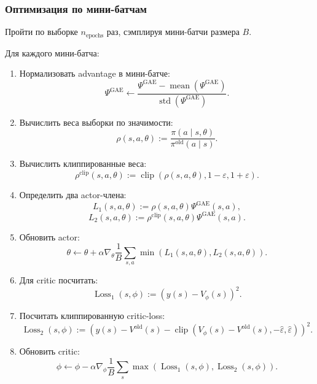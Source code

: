 \documentclass[12pt,a4paper]{article}
\begin{document}
\subsubsection{Оптимизация по мини-батчам}

Пройти по выборке $n_{\mathrm{epochs}}$ раз, сэмплируя мини-батчи размера $B$.

Для каждого мини-батча:

\begin{enumerate}
    \item Нормализовать advantage в мини-батче:
    \[
    \Psi^{\mathrm{GAE}}
    \leftarrow
    \frac{
    \Psi^{\mathrm{GAE}}
    -
    \operatorname{mean}(\Psi^{\mathrm{GAE}})
    }{
    \operatorname{std}(\Psi^{\mathrm{GAE}})
    }.
    \]

    \item Вычислить веса выборки по значимости:
    \[
    \rho(s,a,\theta)
    :=
    \frac{
    \pi(a\mid s,\theta)
    }{
    \pi^{\mathrm{old}}(a\mid s)
    }.
    \]

    \item Вычислить клиппированные веса:
    \[
    \rho^{\mathrm{clip}}(s,a,\theta)
    :=
    \operatorname{clip}
    \left(
    \rho(s,a,\theta),
    1-\varepsilon,
    1+\varepsilon
    \right).
    \]

    \item Определить два actor-члена:
    \[
    L_1(s,a,\theta)
    :=
    \rho(s,a,\theta)
    \Psi^{\mathrm{GAE}}(s,a),
    \]
    \[
    L_2(s,a,\theta)
    :=
    \rho^{\mathrm{clip}}(s,a,\theta)
    \Psi^{\mathrm{GAE}}(s,a).
    \]

    \item Обновить actor:
    \[
    \theta
    \leftarrow
    \theta
    +
    \alpha
    \nabla_\theta
    \frac{1}{B}
    \sum_{s,a}
    \min
    \left(
    L_1(s,a,\theta),
    L_2(s,a,\theta)
    \right).
    \]

    \item Для critic посчитать:
    \[
    \operatorname{Loss}_1(s,\phi)
    :=
    \left(
    y(s)-V_\phi(s)
    \right)^2.
    \]

    \item Посчитать клиппированную critic-loss:
    \[
    \operatorname{Loss}_2(s,\phi)
    :=
    \left(
    y(s)
    -
    V^{\mathrm{old}}(s)
    -
    \operatorname{clip}
    \left(
    V_\phi(s)-V^{\mathrm{old}}(s),
    -\hat\varepsilon,
    \hat\varepsilon
    \right)
    \right)^2.
    \]

    \item Обновить critic:
    \[
    \phi
    \leftarrow
    \phi
    -
    \alpha
    \nabla_\phi
    \frac{1}{B}
    \sum_s
    \max
    \left(
    \operatorname{Loss}_1(s,\phi),
    \operatorname{Loss}_2(s,\phi)
    \right).
    \]
\end{enumerate}
\end{document}
